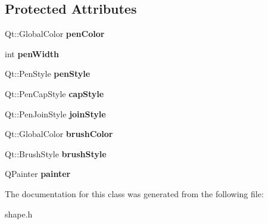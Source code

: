 \subsection*{Protected Attributes}
\begin{DoxyCompactItemize}
\item 
\mbox{\label{class_shape_a54468486d6f4b88380a4ca0c5cf3c978}} 
Qt\+::\+Global\+Color {\bfseries pen\+Color}
\item 
\mbox{\label{class_shape_aeb1f782a11b840f138392c64ad53d11e}} 
int {\bfseries pen\+Width}
\item 
\mbox{\label{class_shape_a0ca3168a8b628b6172c8d7c2050bd0b2}} 
Qt\+::\+Pen\+Style {\bfseries pen\+Style}
\item 
\mbox{\label{class_shape_ab49a905e221eae2ba352d1ebf0b0c6b7}} 
Qt\+::\+Pen\+Cap\+Style {\bfseries cap\+Style}
\item 
\mbox{\label{class_shape_a97bb96c2a982a416c5c522b692209318}} 
Qt\+::\+Pen\+Join\+Style {\bfseries join\+Style}
\item 
\mbox{\label{class_shape_a705f872905fc3f23f059f57051af79c6}} 
Qt\+::\+Global\+Color {\bfseries brush\+Color}
\item 
\mbox{\label{class_shape_a6eeb8fdef70508b76558c2bf95f19360}} 
Qt\+::\+Brush\+Style {\bfseries brush\+Style}
\item 
\mbox{\label{class_shape_a761a117dfc4b157944e512b8a4c89fde}} 
Q\+Painter {\bfseries painter}
\end{DoxyCompactItemize}


The documentation for this class was generated from the following file\+:\begin{DoxyCompactItemize}
\item 
shape.\+h\end{DoxyCompactItemize}
